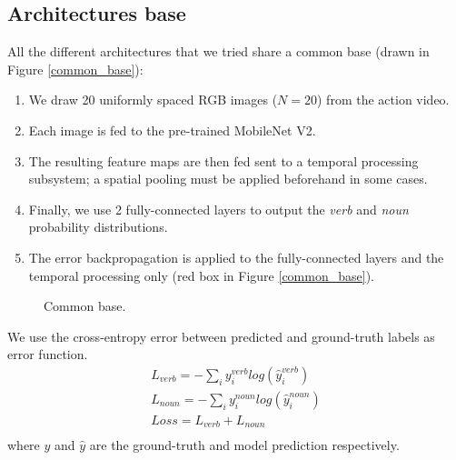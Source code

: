 \documentclass[12pt, a4paper]{report}
\begin{document}
			\subsection{Architectures base}
				All the different architectures that we tried share a common base (drawn in Figure \ref{common_base}):
				\begin{enumerate}
					\item We draw 20 uniformly spaced RGB images ($N=20$) from the action video.
					\item Each image is fed to the pre-trained MobileNet V2.
					\item The resulting feature maps are then fed sent to a temporal processing subsystem; a spatial pooling must be applied beforehand in some cases.
					\item Finally, we use 2 fully-connected layers to output the {\itshape verb} and {\itshape noun} probability distributions.
					\item The error backpropagation is applied to the fully-connected layers and the temporal processing only (red box in Figure \ref{common_base}).
				\end{enumerate}
				\begin{figure}[h!]
					\centering
					\caption{Common base.}
				\end{figure}
				We use the cross-entropy error between predicted and ground-truth labels as error function.
				\begin{align*}
					L_{verb} = -\sum_{i} y^{verb}_{i}log(\hat{y}^{verb}_{i}) \\
					L_{noun} = -\sum_{i} y^{noun}_{i}log(\hat{y}^{noun}_{i}) \\
					Loss = L_{verb} + L_{noun} \\
				\end{align*}
				where $y$ and $\hat{y}$ are the ground-truth and model prediction respectively.
\end{document}
